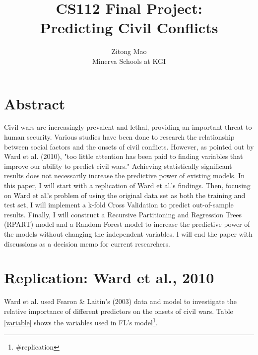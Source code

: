 \documentclass{article}
\title{CS112 Final Project: \\ Predicting Civil Conflicts}
\author{Zitong Mao \\ Minerva Schools at KGI}
\begin{document}
\maketitle

\section{Abstract}
Civil wars are increasingly prevalent and lethal, providing an important threat to human security. Various studies have been done to research the relationship between social factors and the onsets of civil conflicts. However, as pointed out by Ward et al. (2010), "too little attention has been paid to finding variables that improve our ability to predict civil wars." Achieving statistically significant results does not necessarily increase the predictive power of existing models. In this paper, I will start with a replication of Ward et al.'s findings. Then, focusing on Ward et al.'s problem of using the original data set as both the training and test set, I will implement a k-fold Cross Validation to predict out-of-sample results. Finally, I will construct a Recursive Partitioning and Regression Trees (RPART) model and a Random Forest model to increase the predictive power of the models without changing the independent variables. I will end the paper with discussions as a decision memo for current researchers.

\section{Replication: Ward et al., 2010}

Ward et al. used Fearon \& Laitin's (2003) data and model to investigate the relative importance of different predictors on the onsets of civil wars. Table \ref{variable} shows the variables used in FL's model\footnote{\#replication}.
\end{document}
